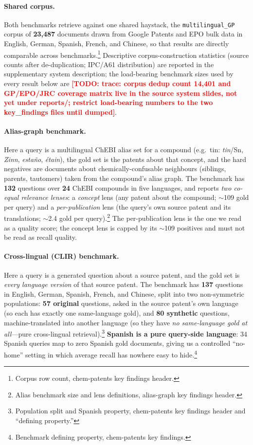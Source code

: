 \documentclass[11pt]{article}
\newcommand{\todo}[1]{\textcolor{red}{\textbf{[TODO: #1]}}}
\begin{document}
\paragraph{Shared corpus.}
Both benchmarks retrieve against one shared haystack, the
\texttt{multilingual\_GP} corpus of \textbf{23{,}487} documents drawn from
Google Patents and EPO bulk data in English, German, Spanish, French, and
Chinese, so that results are directly comparable across benchmarks.\footnote{%
Corpus row count, chem-patents key findings header.} Descriptive
corpus-construction statistics (source counts after de-duplication; IPC/A61
distribution) are reported in the supplementary system description; the
load-bearing benchmark sizes used by every result below are
\todo{trace: corpus dedup count 14{,}401 and GP/EPO/JRC coverage matrix live in
the source system slides, not yet under reports/; restrict load-bearing
numbers to the two key\_findings files until dumped}.

\paragraph{Alias-graph benchmark.}
Here a query is a multilingual ChEBI alias set for a compound (e.g.\ tin:
\emph{tin}/Sn, \emph{Zinn}, \emph{esta\~no}, \emph{\'etain}), the gold set is the
patents about that concept, and the hard negatives are documents about
chemically-confusable neighbours (siblings, parents, tautomers) taken from the
compound's alias graph. The benchmark has \textbf{132} questions over
\textbf{24} ChEBI compounds in five languages, and reports \emph{two co-equal
relevance lenses}: a \emph{concept} lens (any patent about the compound;
$\sim$109 gold per query) and a \emph{per-publication} lens (the query's own
source patent and its translations; $\sim$2.4 gold per query).\footnote{Alias
benchmark size and lens definitions, alias-graph key findings header.} The
per-publication lens is the one we read as a quality score; the concept lens is
capped by its $\sim$109 positives and must not be read as recall quality.

\paragraph{Cross-lingual (CLIR) benchmark.}
Here a query is a generated question about a source patent, and the gold set is
\emph{every language version} of that source patent. The benchmark has
\textbf{137} questions in English, German, Spanish, French, and Chinese, split
into two non-symmetric populations: \textbf{57 original} questions, asked in the
source patent's own language (so each has exactly one same-language gold), and
\textbf{80 synthetic} questions, machine-translated into another language (so
they have \emph{no same-language gold at all}---pure cross-lingual
retrieval).\footnote{Population split and Spanish property, chem-patents key
findings header and ``defining property.''} \textbf{Spanish is a pure
query-side language}: 34 Spanish queries map to zero Spanish gold documents,
giving us a controlled ``no-home'' setting in which average recall has nowhere
easy to hide.\footnote{Benchmark defining property, chem-patents key findings.}
\end{document}
